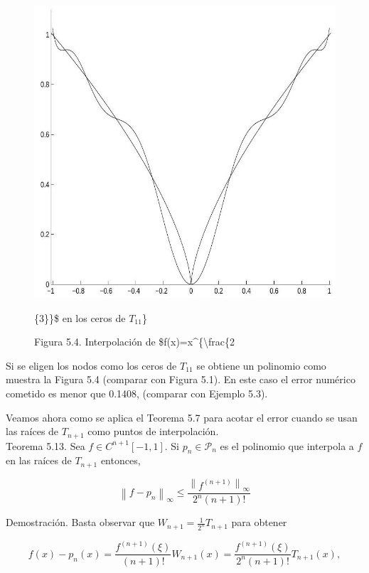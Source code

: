 \documentclass[10pt]{book}
\begin{document}
\begin{figure}[h]
\begin{center}
  \includegraphics[width=\textwidth]{2025_09_05_3888c9ac96bd653d96b4g-104}
\captionsetup{labelformat=empty}
\caption{Figura 5.4. Interpolación de \$f(x)=x\^{}\{\textbackslash frac\{2}\{3\}\}\$ en los ceros de $T_{11}$\}\end{center}
\end{figure}

Si se eligen los nodos como los ceros de $T_{11}$ se obtiene un polinomio como muestra la Figura 5.4 (comparar con Figura 5.1). En este caso el error numérico cometido es menor que 0.1408, (comparar con Ejemplo 5.3).

Veamos ahora como se aplica el Teorema 5.7 para acotar el error cuando se usan las raíces de $T_{n+1}$ como puntos de interpolación.\\
Teorema 5.13. Sea $f \in C^{n+1}[-1,1]$. Si $p_{n} \in \mathcal{P}_{n}$ es el polinomio que interpola a $f$ en las raíces de $T_{n+1}$ entonces,

$$
\left\|f-p_{n}\right\|_{\infty} \leq \frac{\left\|f^{(n+1)}\right\|_{\infty}}{2^{n}(n+1)!}
$$

Demostración. Basta observar que $W_{n+1}=\frac{1}{2^{n}} T_{n+1}$ para obtener

$$
f(x)-p_{n}(x)=\frac{f^{(n+1)}(\xi)}{(n+1)!} W_{n+1}(x)=\frac{f^{(n+1)}(\xi)}{2^{n}(n+1)!} T_{n+1}(x),
$$
\end{document}
